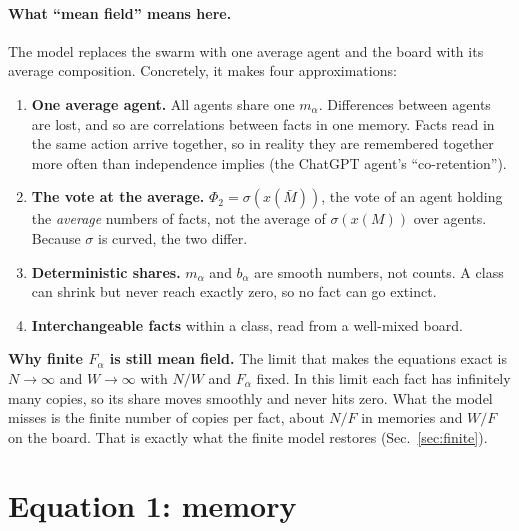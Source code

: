 \documentclass[10pt,a4paper]{article}
\begin{document}
\paragraph{What ``mean field'' means here.} The model replaces the swarm with one average agent and the board with
its average composition. Concretely, it makes four approximations:
\begin{enumerate}
\item \textbf{One average agent.} All agents share one $m_\alpha$. Differences between agents are lost, and so are
  correlations between facts in one memory. Facts read in the same action arrive together, so in reality they are
  remembered together more often than independence implies (the ChatGPT agent's ``co-retention'').
\item \textbf{The vote at the average.} $\Phi_2=\sigma(x(\bar M))$, the vote of an agent holding the \emph{average}
  numbers of facts, not the average of $\sigma(x(M))$ over agents. Because $\sigma$ is curved, the two differ.
\item \textbf{Deterministic shares.} $m_\alpha$ and $b_\alpha$ are smooth numbers, not counts. A class can shrink but
  never reach exactly zero, so no fact can go extinct.
\item \textbf{Interchangeable facts} within a class, read from a well-mixed board.
\end{enumerate}
\textbf{Why finite $F_\alpha$ is still mean field.} The limit that makes the equations exact is $N\to\infty$ and
$W\to\infty$ with $N/W$ and $F_\alpha$ fixed. In this limit each fact has infinitely many copies, so its share moves
smoothly and never hits zero. What the model misses is the finite number of copies per fact, about $N/F$ in memories
and $W/F$ on the board. That is exactly what the finite model restores (Sec.~\ref{sec:finite}).

\section{Equation 1: memory}
\label{sec:eq1}
\end{document}
